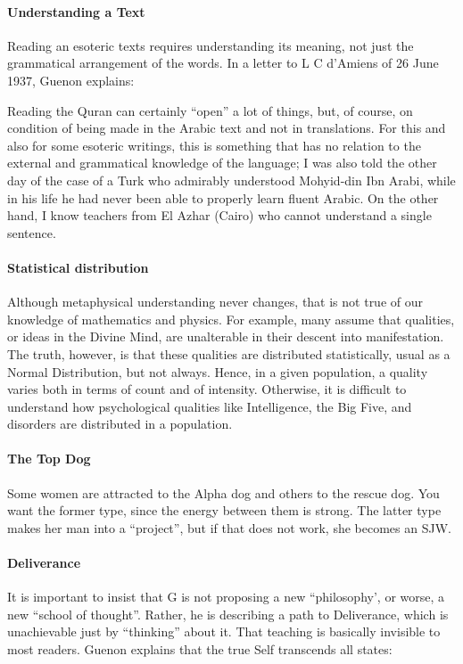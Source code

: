 \paragraph{Understanding a Text} Reading an esoteric texts requires understanding its meaning, not just the grammatical arrangement of the words. In a letter to L C d'Amiens of 26 June 1937, Guenon explains:

\begin{quotex}
Reading the Quran can certainly ``open'' a lot of things, but, of course, on condition of being made in the Arabic text and not in translations. For this and also for some esoteric writings, this is something that has no relation to the external and grammatical knowledge of the language; I was also told the other day of the case of a Turk who admirably understood Mohyid-din Ibn Arabi, while in his life he had never been able to properly learn fluent Arabic. On the other hand, I know teachers from El Azhar (Cairo) who cannot understand a single sentence.
\end{quotex}


\paragraph{Statistical distribution} Although metaphysical understanding never changes, that is not true of our knowledge of mathematics and physics. For example, many assume that qualities, or ideas in the Divine Mind, are unalterable in their descent into manifestation. The truth, however, is that these qualities are distributed statistically, usual as a Normal Distribution, but not always. Hence, in a given population, a quality varies both in terms of count and of intensity. Otherwise, it is difficult to understand how psychological qualities like Intelligence, the Big Five, and disorders are distributed in a population.

\paragraph{The Top Dog} Some women are attracted to the Alpha dog and others to the rescue dog. You want the former type, since the energy between them is strong. The latter type makes her man into a ``project'', but if that does not work, she becomes an SJW.

\paragraph{Deliverance} It is important to insist that G is not proposing a new ``philosophy', or worse, a new ``school of thought''. Rather, he is describing a path to Deliverance, which is unachievable just by ``thinking'' about it. That teaching is basically invisible to most readers. Guenon explains that the true Self transcends all states:

